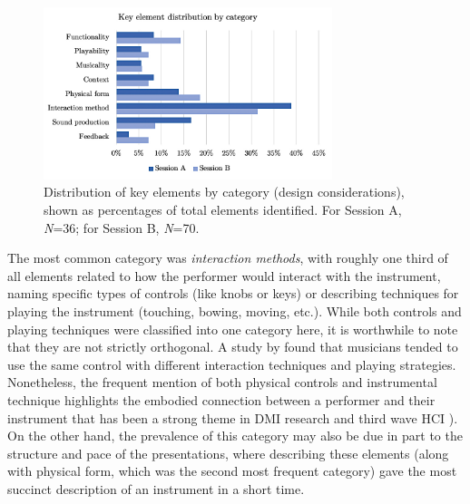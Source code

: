 \documentclass[letterpaper, 12pt]{article}
\begin{document}
\begin{figure}[htbp]
    \centering
    \includegraphics[width=0.75\textwidth]{ch3_key_element_categories}
    \caption[Design for Performance workshop: Key elements by category]{Distribution of key elements by category (design considerations), shown as percentages of total elements identified. For Session A, \emph{N}=36; for Session B, \emph{N}=70.}
    \label{ch3-fig:key-elements-by-category}
\end{figure}

The most common category was \emph{interaction methods}, with roughly one third of all elements related to how the performer would interact with the instrument, naming specific types of controls (like knobs or keys) or describing techniques for playing the instrument (touching, bowing, moving, etc.). While both controls and playing techniques were classified into one category here, it is worthwhile to note that they are not strictly orthogonal. A study by \citep{Marshall2009b} found that musicians tended to use the same control with different interaction techniques and playing strategies. Nonetheless, the frequent mention of both physical controls and instrumental technique highlights the embodied connection between a performer and their instrument that has been a strong theme in DMI research \citep{Emerson2018,Magnusson2008} and third wave HCI \citep{Harrison2007}). On the other hand, the prevalence of this category may also be due in part to the structure and pace of the presentations, where describing these elements (along with physical form, which was the second most frequent category) gave the most succinct description of an instrument in a short time. 

\end{document}
